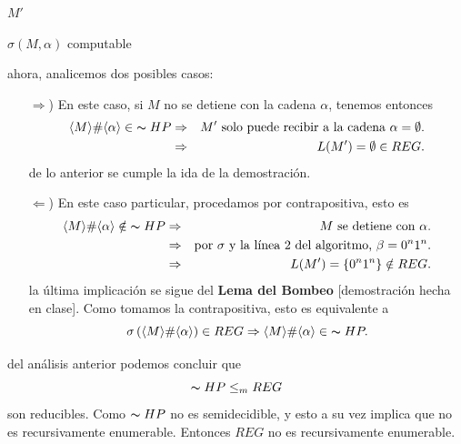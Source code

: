 \documentclass{article}
\begin{document}
\begin{algorithm}[H]
  \SetAlgorithmName{}{}%
  \DontPrintSemicolon

             {\Return $M'$\;}
             \caption{$\sigma(M, \alpha)$ computable} \label{sigma}%
             \DecMargin{1em}
\end{algorithm}

ahora, analicemos dos posibles casos:
\begin{itemize}
\item[$\Rightarrow$)] En este caso, si $M$ no se detiene con la cadena $\alpha$, tenemos entonces
  \begin{eqnarray*}
  \langle M \rangle \# \langle \alpha \rangle \in\; \thicksim HP
  &\Rightarrow& M' \text{ solo puede recibir a la cadena } \alpha = \emptyset.\\
  &\Rightarrow& L(M') = \emptyset \in REG.
  \end{eqnarray*}
  de lo anterior se cumple la ida de la demostración.
\item[$\Leftarrow$)] En este caso particular, procedamos por contrapositiva, esto es
  \begin{eqnarray*}
    \langle M \rangle \# \langle \alpha \rangle \notin\; \thicksim HP
    &\Rightarrow& M \text{ se detiene con } \alpha.\\
    &\Rightarrow& \text{por } \sigma \text{ y la línea 2 del algoritmo, } \beta = 0^n1^n.\\
    &\Rightarrow& L(M') = \{0^n1^n\} \notin REG.
  \end{eqnarray*}
  la última implicación se sigue del \textbf{Lema del Bombeo} [demostración hecha en clase].
  Como tomamos la contrapositiva, esto es equivalente a
  \[ \sigma\left(\langle M \rangle \# \langle \alpha \rangle\right) \in REG
  \Rightarrow \langle M \rangle \# \langle \alpha \rangle \in\; \thicksim HP.\]
\end{itemize}
del análisis anterior podemos concluir que 
\[
\thicksim HP \leq_{m} REG
\]
son reducibles. Como $\thicksim HP$ no es semidecidible, y esto a su vez implica que
no es recursivamente enumerable. Entonces $REG$ no es recursivamente enumerable.
\end{document}
